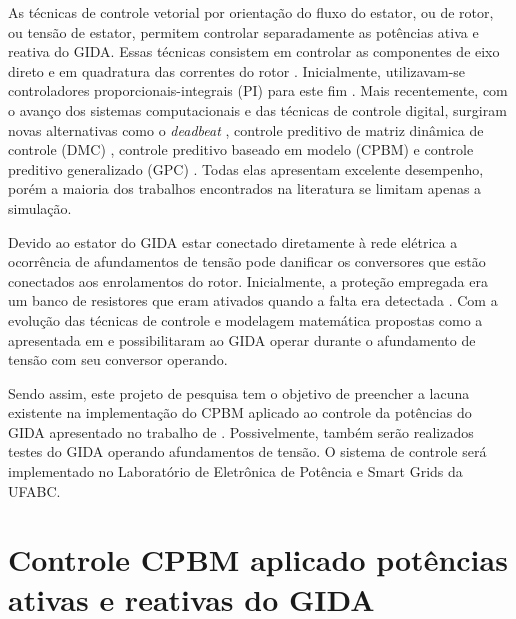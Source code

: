 	As técnicas de controle vetorial por orientação do fluxo do estator, ou de rotor, ou tensão de estator, permitem controlar separadamente as potências ativa e reativa do GIDA. Essas técnicas consistem em controlar as componentes de eixo direto e em quadratura das correntes do rotor \cite{murilodq,eixodqmonografia}. Inicialmente, utilizavam-se controladores proporcionais-integrais (PI) para este fim \cite{alfeu}. Mais recentemente, com o avanço dos sistemas computacionais e das técnicas de controle digital, surgiram novas alternativas como o \emph{deadbeat} \cite{deadbeat,deadbeatieee}, controle preditivo de matriz dinâmica de controle (DMC) \cite{dmcieee}, controle preditivo baseado em modelo (CPBM) \cite{alfeu,paperalfeu} e controle preditivo generalizado (GPC) \cite{gpcieee}. Todas elas apresentam excelente desempenho, porém a maioria dos trabalhos encontrados na literatura se limitam apenas a simulação.
	
	Devido ao estator do GIDA estar conectado diretamente à rede elétrica a ocorrência de afundamentos de tensão pode danificar os conversores que estão conectados aos enrolamentos do rotor. Inicialmente, a proteção empregada era um banco de resistores que eram ativados quando a falta era detectada \cite{rodrigo8afundamento,rodrigo9afundamento, rodrigoquedatensao}. Com a evolução das técnicas de controle e modelagem matemática propostas como a apresentada em   e  possibilitaram ao GIDA operar durante o afundamento de tensão com seu conversor operando.
	
	Sendo assim, este projeto de pesquisa tem o objetivo de preencher a lacuna existente na implementação do CPBM aplicado ao controle da potências do GIDA apresentado no trabalho de . Possivelmente, também serão realizados testes do GIDA operando afundamentos de tensão. O sistema de controle será implementado no Laboratório de Eletrônica de Potência e Smart Grids da UFABC.
	
	\begingroup
		\let\clearpage\relax
		\chapter{Controle CPBM aplicado potências ativas e reativas do GIDA}
		\label{capitulo:teoria}
	\endgroup
	
